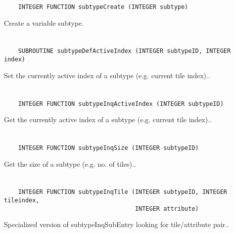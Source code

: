 \begin{verbatim}
    INTEGER FUNCTION subtypeCreate (INTEGER subtype)
\end{verbatim}

Create a variable subtype.


\section*{\tt {}}

\begin{verbatim}
    SUBROUTINE subtypeDefActiveIndex (INTEGER subtypeID, INTEGER index)
\end{verbatim}

Set the currently active index of a subtype (e.g. current tile index)..


\section*{\tt {}}

\begin{verbatim}
    INTEGER FUNCTION subtypeInqActiveIndex (INTEGER subtypeID)
\end{verbatim}

Get the currently active index of a subtype (e.g. current tile index)..


\section*{\tt {}}

\begin{verbatim}
    INTEGER FUNCTION subtypeInqSize (INTEGER subtypeID)
\end{verbatim}

Get the size of a subtype (e.g. no. of tiles)..


\section*{\tt {}}

\begin{verbatim}
    INTEGER FUNCTION subtypeInqTile (INTEGER subtypeID, INTEGER tileindex,
                                     INTEGER attribute)
\end{verbatim}

Specialized version of subtypeInqSubEntry looking for tile/attribute pair..


